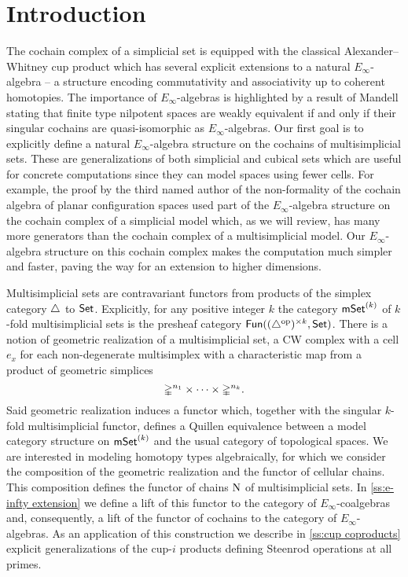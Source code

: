 
\section{Introduction} \label{s:introduction}

The cochain complex of a simplicial set is equipped with the classical Alexander--Whitney cup product which has several explicit extensions to a natural $E_\infty$-algebra \cite{mcclure2003multivariable, berger2004combinatorial, medina2020prop1} -- a structure encoding commutativity and associativity up to coherent homotopies.
The importance of $E_\infty$-algebras is highlighted by a result of Mandell \cite{mandell2006homotopy_type} stating that finite type nilpotent spaces are weakly equivalent if and only if their singular cochains are quasi-isomorphic as $E_\infty$-algebras.
Our first goal is to explicitly define a natural $E_\infty$-algebra structure on the cochains of multisimplicial sets.
These are generalizations of both simplicial and cubical sets which are useful for concrete computations since they can model spaces using fewer cells.
For example, the proof by the third named author of the non-formality of the cochain algebra of planar configuration spaces \cite{formality} used part of the $E_\infty$-algebra structure on the cochain complex of a simplicial model which, as we will review, has many more generators than the cochain complex of a multisimplicial model.
Our $E_\infty$-algebra structure on this cochain complex makes the computation much simpler and faster, paving the way for an extension to higher dimensions.

Multisimplicial sets are contravariant functors from products of the simplex category $\triangle$ to $\mathsf{Set}$.
Explicitly, for any positive integer $k$ the category $\mathsf{mSet}^{(k)}$ of $k$-fold multisimplicial sets is the presheaf category $\mathsf{Fun}((\triangle^{\mathrm{op}})^{\times k}, \mathsf{Set})$.
There is a notion of geometric realization of a multisimplicial set, a CW complex with a cell $e_x$ for each non-degenerate multisimplex with a characteristic map from a product of geometric simplices
\[
\mathbb{\Delta}^{n_1}\times\dots\times\mathbb{\Delta}^{n_k}.
\]
Said geometric realization induces a functor which, together with the singular $k$-fold multisimplicial functor, defines a Quillen equivalence between a model category structure on $\mathsf{mSet}^{(k)}$ and the usual category of topological spaces.
We are interested in modeling homotopy types algebraically, for which we consider the composition of the geometric realization and the functor of cellular chains.
This composition defines the functor of chains $\operatorname{N}$ of multisimplicial sets.
In \cref{ss:e-infty extension} we define a lift of this functor to the category of $E_\infty$-coalgebras and, consequently, a lift of the functor of cochains to the category of $E_\infty$-algebras.
As an application of this construction we describe in \cref{ss:cup coproducts} explicit generalizations of the cup-$i$ products defining Steenrod operations at all primes.

